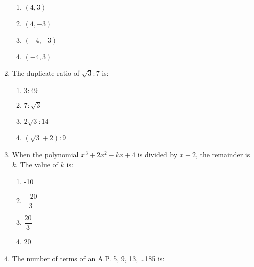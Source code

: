 \begin{enumerate}[label=(\roman*)]
        \begin{multicols}{2}
        \begin{enumerate}[label=(\alph*)]
            \item $(4, 3)$
            \item $(4, -3)$
            \item $(-4, -3)$
            \item $(-4, 3)$
        \end{enumerate}
        \end{multicols}

    \item The duplicate ratio of $\sqrt{3} : 7$ is:

        \begin{multicols}{2}
        \begin{enumerate}[label=(\alph*)]
            \item $3:49$
            \item $7:\sqrt{3}$
            \item $2\sqrt3:14$
            \item $(\sqrt3 + 2):9$
        \end{enumerate}
        \end{multicols}

    \item When the polynomial $x^3 + 2x^2 - kx + 4$ is divided by 
        $x-2$, the remainder is $k$. The value of $k$ is:

        \begin{multicols}{2}
        \begin{enumerate}[label=(\alph*)]
            \item -10
            \item $\dfrac{-20}{3}$
            \item $\dfrac{20}{3}$
            \item 20
        \end{enumerate}
        \end{multicols}

    \item The number of terms of an A.P. 5, 9, 13, \dots 185 is:


\end{enumerate}
